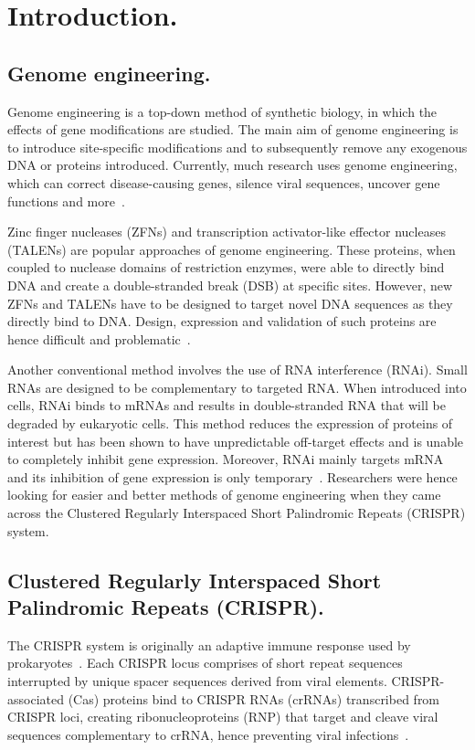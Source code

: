 \documentclass[11pt]{article}
\begin{document}
\newpage
{}
\section{Introduction.} 

\subsection{Genome engineering.}
Genome engineering is a top-down method of synthetic biology, in which the effects of gene modifications are studied. The main aim of genome engineering is to introduce site-specific modifications and to subsequently remove any exogenous DNA or proteins introduced. Currently, much research uses genome engineering, which can correct disease-causing genes, silence viral sequences, uncover gene functions and more~\citep{Gupta2014, Kaminski2016, Ran2013a}.

Zinc finger nucleases (ZFNs) and transcription activator-like effector nucleases (TALENs) are popular approaches of genome engineering. These proteins, when coupled to nuclease domains of restriction enzymes, were able to directly bind DNA and create a double-stranded break (DSB) at specific sites. However, new ZFNs and TALENs have to be designed to target novel DNA sequences as they directly bind to DNA. Design, expression and validation of such proteins are hence difficult and problematic~\citep{Doudna2014}.

Another conventional method involves the use of RNA interference (RNAi). Small RNAs are designed to be complementary to targeted RNA. When introduced into cells, RNAi binds to mRNAs and results in double-stranded RNA that will be degraded by eukaryotic cells. This method reduces the expression of proteins of interest but has been shown to have unpredictable off-target effects and is unable to completely inhibit gene expression. Moreover, RNAi mainly targets mRNA and its inhibition of gene expression is only temporary~\citep{Gilles2014}. Researchers were hence looking for easier and better methods of genome engineering when they came across the Clustered Regularly Interspaced Short Palindromic Repeats (CRISPR) system.

\subsection{Clustered Regularly Interspaced Short Palindromic Repeats (CRISPR).}
The CRISPR system is originally an adaptive immune response used by prokaryotes~\citep{Sorek2013}. Each CRISPR locus comprises of short repeat sequences interrupted by unique spacer sequences derived from viral elements. CRISPR-associated (Cas) proteins bind to CRISPR RNAs (crRNAs) transcribed from CRISPR loci, creating ribonucleoproteins (RNP) that target and cleave viral sequences complementary to crRNA, hence preventing viral infections~\citep{Sternberg2015}. 
\end{document}
